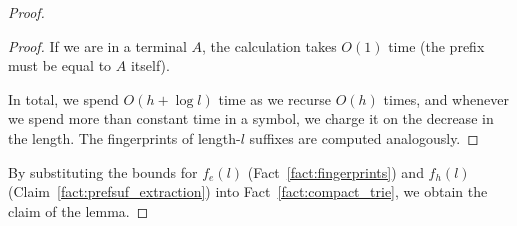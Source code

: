 \begin{proof}
\begin{proof}
    If we are in a terminal $A$, the calculation takes $O(1)$ time (the prefix must be equal to $A$ itself). 
     
    In total, we spend $O(h+\log l)$ time as we recurse $O(h)$ times, and whenever we spend more than constant time in a symbol, we charge it on the decrease in the length. The fingerprints of length-$l$ suffixes are computed analogously.
    \end{proof}
    
    
    By substituting the bounds for $f_e(l)$ (Fact~\ref{fact:fingerprints}) and $f_h(l)$ (Claim~\ref{fact:prefsuf_extraction}) into Fact~\ref{fact:compact_trie}, we obtain the claim of the lemma.
\end{proof}


